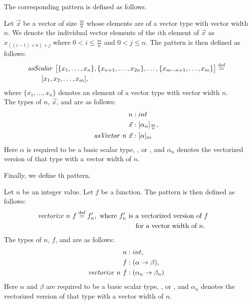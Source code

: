 \noindent
The corresponding \asScalar pattern is defined as follows.
\begin{definition}
  \label{definition:pattern:asScalar}
  Let $\vec{x}$ be a vector of size $\frac{m}{n}$ whose elements are of a vector type with vector width $n$.
  We denote the individual vector elements of the $i$th element of $\vec{x}$ as $x_{((i-1)\times n)+j}$ where $0 < i \leq \frac{m}{n}$ and $0 < j \leq n$.
  The \asScalar pattern is then defined as follows:
  \begin{align*}
    &\text{\textit{asScalar}}\ \big[\{x_1, \ldots, x_n\}, \{x_{n+1}, \ldots, x_{2n}\}, \ldots, \{x_{m-n+1}, \ldots, x_m\}\big] \stackrel{\textrm{\scriptsize def}}{=}\\
    &\qquad [x_1, x_2, \dots, x_m],
  \end{align*}
  where $\{x_1,\ldots,x_n\}$ denotes an element of a vector type with vector width $n$.\\
  The types of $n$, $\vec{x}$, and \asVector are as follows:
  \begin{align*}
    n &: int\\
    \vec{x} &: [\alpha_n]_{\frac{m}{n}},\\
    \text{\textit{asVector}}\ n\ \vec{x} &: [\alpha]_m
  \end{align*}
  Here $\alpha$ is required to be a basic scalar type, \eg,  or , and $\alpha_n$ denotes the vectorized version of that type with a vector width of $n$.
\end{definition}

\noindent
Finally, we define th \vect pattern.
\begin{definition}
  \label{definition:pattern:vect}
  Let $n$ be an integer value.
  Let $f$ be a function.
  The \vect pattern is then defined as follows:
  \begin{align*}
    \text{\textit{vectorize}}\ n\ f &\stackrel{\textrm{\scriptsize def}}{=} f'_n, \begin{aligned}[t]
      \text{ where $f'_n$ is a vectorized version of $f$}\\
      \text{ for a vector width of $n$. }
    \end{aligned}
  \end{align*}
  The types of $n$, $f$, and \vect are as follows:
  \begin{align*}
    n &: int,\\
    f &: (\alpha \rightarrow \beta),\\
    \text{\textit{vectorize}}\ n\ f &: (\alpha_n \rightarrow \beta_n)
  \end{align*}
  Here $\alpha$ and $\beta$ are required to be a basic scalar type, \eg,  or , and $\alpha_n$ denotes the vectorized version of that type with a vector width of $n$.
\end{definition}

